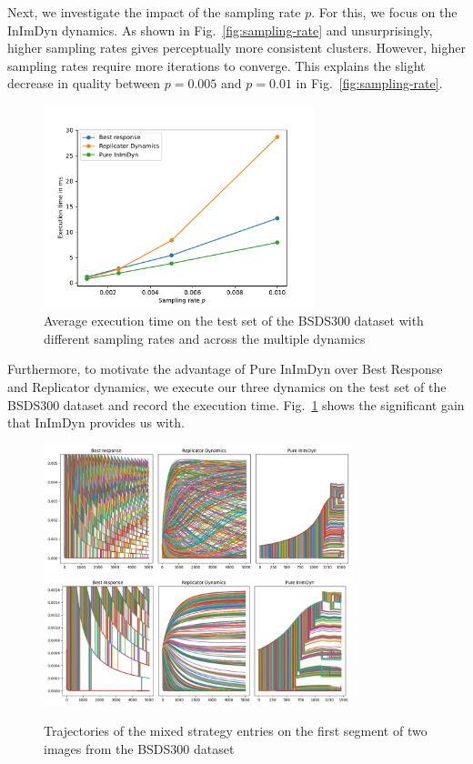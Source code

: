 \documentclass[11pt,a4paper]{article}
\begin{document}
Next, we investigate the impact of the sampling rate $p$. For this, we focus on the InImDyn dynamics. As shown in Fig.~\ref{fig:sampling-rate} and unsurprisingly, higher sampling rates gives perceptually more consistent clusters. However, higher sampling rates require more iterations to converge. This explains the slight decrease in quality between $p=0.005$ and $p=0.01$ in Fig.~\ref{fig:sampling-rate}.

\begin{figure}
    \centering
    \includegraphics[width=0.7\textwidth]{figures/execution_time.pdf}
    \caption{Average execution time on the test set of the BSDS300 dataset with different sampling rates and across the multiple dynamics}
    \label{fig:execution-time}
\end{figure}

Furthermore, to motivate the advantage of Pure InImDyn over Best Response and Replicator dynamics, we execute our three dynamics on the test set of the BSDS300 dataset and record the execution time. Fig.~\ref{fig:execution-time} shows the significant gain that InImDyn provides us with.

\begin{figure}
    \centering
    \includegraphics[width=0.8\textwidth]{figures/trajectories/102061.png}
    \includegraphics[width=0.8\textwidth]{figures/trajectories/196073.png}
    \caption{Trajectories of the mixed strategy entries on the first segment of two images from the BSDS300 dataset}
    \label{fig:trajectories}
\end{figure}
\end{document}
